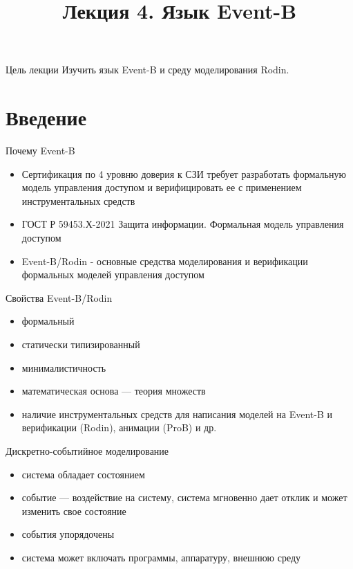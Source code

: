 \documentclass[hyperref={unicode=true}]{beamer}
\title{Лекция 4. Язык Event-B}
\author{}
\date{}
\begin{document}
	\begin{frame}{}
		\titlepage
	\end{frame}

    \begin{frame}{Цель лекции}
    Изучить язык Event-B и среду моделирования Rodin.
    \end{frame}

    \section{Введение}

	\begin{frame}{Почему Event-B}
    \begin{itemize}
		\item Сертификация по 4 уровню доверия к СЗИ требует 
		      разработать формальную модель управления доступом
			  и верифицировать ее с применением инструментальных
			  средств
		\item ГОСТ Р 59453.Х-2021 Защита информации. Формальная
		      модель управления доступом
		\item Event-B/Rodin - основные средства моделирования
			  и верификации формальных моделей управления доступом
	\end{itemize}
    \end{frame}

	\begin{frame}{Свойства Event-B/Rodin}
		\begin{itemize}
			\item формальный
			\item статически типизированный
			\item минималистичность
			\item математическая основа --- теория множеств
			\item наличие инструментальных средств для написания
			      моделей на Event-B и верификации (Rodin),
				  анимации (ProB) и др.
		\end{itemize}
	\end{frame}

	\begin{frame}{Дискретно-событийное моделирование}
		\begin{itemize}
			\item система обладает состоянием
			\item событие --- воздействие на систему,
					система мгновенно дает отклик
					и может изменить свое состояние
			\item события упорядочены
			\item система может включать программы,
				  аппаратуру, внешнюю среду
		\end{itemize}
	\end{frame}
\end{document}
